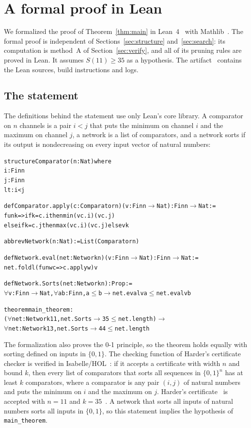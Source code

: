 
\section{A formal proof in Lean}\label{sec:lean}

We formalized the proof of Theorem~\ref{thm:main} in Lean~4~\cite{Lean4} with Mathlib~\cite{Mathlib}. The
formal proof is independent of Sections~\ref{sec:structure} and~\ref{sec:search}: its computation is method~A
of Section~\ref{sec:verify}, and all of its pruning rules are proved in Lean. It assumes $S(11)\ge35$ as a
hypothesis. The artifact~\cite{LeanRepo} contains the Lean sources, build instructions and logs.

\subsection{The statement}
The definitions behind the statement use only Lean's core library. A comparator on $n$ channels is a pair
$i<j$ that puts the minimum on channel $i$ and the maximum on channel $j$, a network is a list of comparators,
and a network sorts if its output is nondecreasing on every input vector of natural numbers:
\begin{alltt}\small
structure Comparator (n : Nat) where
  i : Fin n
  j : Fin n
  lt : i < j

def Comparator.apply (c : Comparator n) (v : Fin n \(\to\) Nat) : Fin n \(\to\) Nat :=
  fun k => if k = c.i then min (v c.i) (v c.j)
    else if k = c.j then max (v c.i) (v c.j) else v k

abbrev Network (n : Nat) := List (Comparator n)

def Network.eval (net : Network n) (v : Fin n \(\to\) Nat) : Fin n \(\to\) Nat :=
  net.foldl (fun w c => c.apply w) v

def Network.Sorts (net : Network n) : Prop :=
  \(\forall\) v : Fin n \(\to\) Nat, \(\forall\) a b : Fin n, a \(\le\) b \(\to\) net.eval v a \(\le\) net.eval v b

theorem main_theorem :
    (\(\forall\) net : Network 11, net.Sorts \(\to\) 35 \(\le\) net.length) \(\to\)
      \(\forall\) net : Network 13, net.Sorts \(\to\) 44 \(\le\) net.length
\end{alltt}
The formalization also proves the 0-1 principle, so the theorem holds equally with sorting defined on inputs in
$\{0,1\}$. The checking function of Harder's certificate checker is verified in
Isabelle/HOL~\cite{Har22,HarRepo}: if it accepts a certificate with width $n$ and bound $k$, then every list
of comparators that sorts all sequences in $\{0,1\}^n$ has at least $k$ comparators, where a comparator is any
pair $(i,j)$ of natural numbers and puts the minimum on $i$ and the maximum on $j$. Harder's
certificate~\cite{Har19} is accepted with $n=11$ and $k=35$~\cite{Har22}. A network that sorts all inputs of
natural numbers sorts all inputs in $\{0,1\}$, so this statement implies the hypothesis of
\texttt{main\_theorem}.

